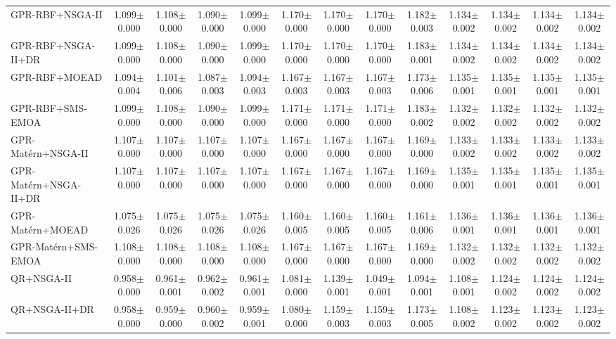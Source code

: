\begin{table}[htbp]
{\begin{tabular}{l c c c c c c c c c c c c}
\hline
GPR-RBF+NSGA-II & 1.099$\pm$0.000 & 1.108$\pm$0.000 & 1.090$\pm$0.000 & 1.099$\pm$0.000 & 1.170$\pm$0.000 & 1.170$\pm$0.000 & 1.170$\pm$0.000 & 1.182$\pm$0.003 & 1.134$\pm$0.002 & 1.134$\pm$0.002 & 1.134$\pm$0.002 & 1.134$\pm$0.002 \\
GPR-RBF+NSGA-II+DR & 1.099$\pm$0.000 & 1.108$\pm$0.000 & 1.090$\pm$0.000 & 1.099$\pm$0.000 & 1.170$\pm$0.000 & 1.170$\pm$0.000 & 1.170$\pm$0.000 & 1.183$\pm$0.001 & 1.134$\pm$0.002 & 1.134$\pm$0.002 & 1.134$\pm$0.002 & 1.134$\pm$0.002 \\
GPR-RBF+MOEAD & 1.094$\pm$0.004 & 1.101$\pm$0.006 & 1.087$\pm$0.003 & 1.094$\pm$0.003 & 1.167$\pm$0.003 & 1.167$\pm$0.003 & 1.167$\pm$0.003 & 1.173$\pm$0.006 & 1.135$\pm$0.001 & 1.135$\pm$0.001 & 1.135$\pm$0.001 & 1.135$\pm$0.001 \\
GPR-RBF+SMS-EMOA & 1.099$\pm$0.000 & 1.108$\pm$0.000 & 1.090$\pm$0.000 & 1.099$\pm$0.000 & 1.171$\pm$0.000 & 1.171$\pm$0.000 & 1.171$\pm$0.000 & 1.183$\pm$0.002 & 1.132$\pm$0.002 & 1.132$\pm$0.002 & 1.132$\pm$0.002 & 1.132$\pm$0.002 \\
GPR-Mat\'ern+NSGA-II & 1.107$\pm$0.000 & 1.107$\pm$0.000 & 1.107$\pm$0.000 & 1.107$\pm$0.000 & 1.167$\pm$0.000 & 1.167$\pm$0.000 & 1.167$\pm$0.000 & 1.169$\pm$0.000 & 1.133$\pm$0.002 & 1.133$\pm$0.002 & 1.133$\pm$0.002 & 1.133$\pm$0.002 \\
GPR-Mat\'ern+NSGA-II+DR & 1.107$\pm$0.000 & 1.107$\pm$0.000 & 1.107$\pm$0.000 & 1.107$\pm$0.000 & 1.167$\pm$0.000 & 1.167$\pm$0.000 & 1.167$\pm$0.000 & 1.169$\pm$0.000 & 1.135$\pm$0.001 & 1.135$\pm$0.001 & 1.135$\pm$0.001 & 1.135$\pm$0.001 \\
GPR-Mat\'ern+MOEAD & 1.075$\pm$0.026 & 1.075$\pm$0.026 & 1.075$\pm$0.026 & 1.075$\pm$0.026 & 1.160$\pm$0.005 & 1.160$\pm$0.005 & 1.160$\pm$0.005 & 1.161$\pm$0.006 & 1.136$\pm$0.001 & 1.136$\pm$0.001 & 1.136$\pm$0.001 & 1.136$\pm$0.001 \\
GPR-Mat\'ern+SMS-EMOA & 1.108$\pm$0.000 & 1.108$\pm$0.000 & 1.108$\pm$0.000 & 1.108$\pm$0.000 & 1.167$\pm$0.000 & 1.167$\pm$0.000 & 1.167$\pm$0.000 & 1.169$\pm$0.000 & 1.132$\pm$0.002 & 1.132$\pm$0.002 & 1.132$\pm$0.002 & 1.132$\pm$0.002 \\
QR+NSGA-II & 0.958$\pm$0.000 & 0.961$\pm$0.001 & 0.962$\pm$0.002 & 0.961$\pm$0.001 & 1.081$\pm$0.000 & 1.139$\pm$0.001 & 1.049$\pm$0.001 & 1.094$\pm$0.001 & 1.108$\pm$0.001 & 1.124$\pm$0.002 & 1.124$\pm$0.002 & 1.124$\pm$0.002 \\
QR+NSGA-II+DR & 0.958$\pm$0.000 & 0.959$\pm$0.000 & 0.960$\pm$0.002 & 0.959$\pm$0.001 & 1.080$\pm$0.000 & 1.159$\pm$0.003 & 1.159$\pm$0.003 & 1.173$\pm$0.005 & 1.108$\pm$0.002 & 1.123$\pm$0.002 & 1.123$\pm$0.002 & 1.123$\pm$0.002 \\

\end{tabular}}
\end{table}
